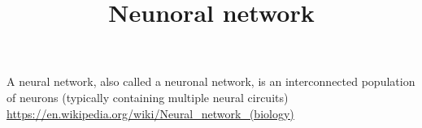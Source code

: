 \documentclass[a4paper]{article}
\title{Neunoral network}
\date{}
\begin{document}
    \maketitle
    A neural network, also called a neuronal network, is an interconnected population of neurons (typically containing multiple neural circuits) \url{https://en.wikipedia.org/wiki/Neural_network_(biology)}
\end{document}
